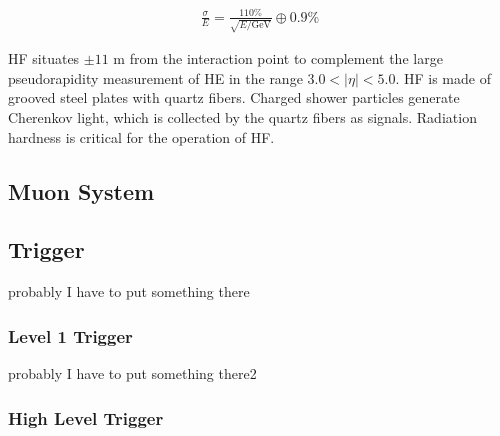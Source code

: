 \begin{align*}
\frac{\sigma}{E}=\frac{110\%}{\sqrt{E/\textrm{GeV}}}\oplus 0.9\%
\end{align*}

HF situates $\pm11$ m from the interaction point to complement the large pseudorapidity measurement of HE in the range $3.0<|\eta|<5.0$. HF is made of grooved steel plates with quartz fibers. Charged shower particles generate Cherenkov light, which is collected by the quartz fibers as signals. Radiation hardness is critical for the operation of HF.   



\subsection{Muon System}




\subsection{Trigger}
probably I have to put something there


\subsubsection{Level 1 Trigger}
probably I have to put something there2



\subsubsection{High Level Trigger}

